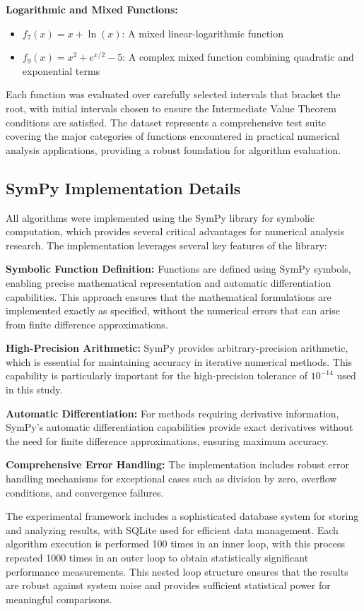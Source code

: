 \documentclass[amsmath, amssymb, aps]{revtex4-2}
\begin{document}
\textbf{Logarithmic and Mixed Functions:}
\begin{itemize}
\item $f_7(x) = x + \ln(x)$: A mixed linear-logarithmic function
\item $f_9(x) = x^2 + e^{x/2} - 5$: A complex mixed function combining quadratic and exponential terms
\end{itemize}

Each function was evaluated over carefully selected intervals that bracket the root, with initial intervals chosen to ensure the Intermediate Value Theorem conditions are satisfied. The dataset represents a comprehensive test suite covering the major categories of functions encountered in practical numerical analysis applications, providing a robust foundation for algorithm evaluation.

\subsection{SymPy Implementation Details}

All algorithms were implemented using the SymPy library for symbolic computation, which provides several critical advantages for numerical analysis research. The implementation leverages several key features of the library:

\textbf{Symbolic Function Definition:} Functions are defined using SymPy symbols, enabling precise mathematical representation and automatic differentiation capabilities. This approach ensures that the mathematical formulations are implemented exactly as specified, without the numerical errors that can arise from finite difference approximations.

\textbf{High-Precision Arithmetic:} SymPy provides arbitrary-precision arithmetic, which is essential for maintaining accuracy in iterative numerical methods. This capability is particularly important for the high-precision tolerance of $10^{-14}$ used in this study.

\textbf{Automatic Differentiation:} For methods requiring derivative information, SymPy's automatic differentiation capabilities provide exact derivatives without the need for finite difference approximations, ensuring maximum accuracy.

\textbf{Comprehensive Error Handling:} The implementation includes robust error handling mechanisms for exceptional cases such as division by zero, overflow conditions, and convergence failures.

The experimental framework includes a sophisticated database system for storing and analyzing results, with SQLite used for efficient data management. Each algorithm execution is performed 100 times in an inner loop, with this process repeated 1000 times in an outer loop to obtain statistically significant performance measurements. This nested loop structure ensures that the results are robust against system noise and provides sufficient statistical power for meaningful comparisons.
\end{document}
